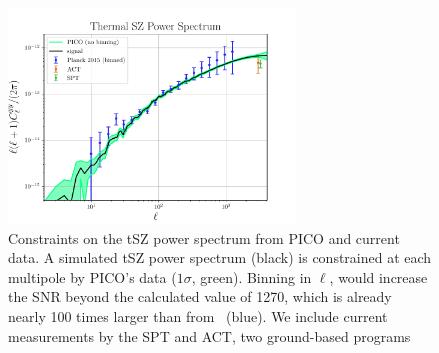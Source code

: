 \documentclass[PICOReport.tex]{subfiles}
\begin{document}
\begin{figure}
\hspace{-0.1in}
\parbox{3.1in}{\centerline{
\includegraphics[width=3.0in]{images/PICO_tSZ_PS_plot.pdf} } }
\hspace{0.in}
\parbox{3.4in}{
\caption{\captiontext  
Constraints on the tSZ power spectrum from PICO and current data.  A simulated tSZ power spectrum (black) is constrained at each multipole by PICO's data ($1\sigma$, green). Binning in $\ell$, would increase the \ac{SNR} beyond the calculated value of 1270, which is already nearly 100 times larger than from \planck\ (blue). We include current measurements by the SPT and ACT, two ground-based programs~\citep{Sievers2013,George2015}
\label{fig:PICO_tSZ_PS} 
} }
\vspace{-0.1in}
\end{figure}
\end{document}
